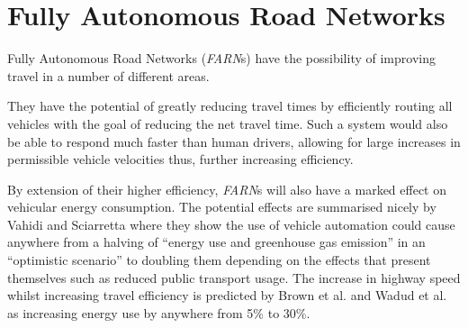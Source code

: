 \section{Fully Autonomous Road Networks}

Fully Autonomous Road Networks (\textit{FARN}s) have the possibility of improving travel in a number of different areas.

They have the potential of greatly reducing travel times by efficiently routing all vehicles with the goal of reducing the net travel time. Such a system would also be able to respond much faster than human drivers, allowing for large increases in permissible vehicle velocities thus, further increasing efficiency.

By extension of their higher efficiency, \textit{FARN}s will also have a marked effect on vehicular energy consumption. The potential effects are summarised nicely by Vahidi and Sciarretta\cite{vahidiEnergySavingPotentials2018} where they show the use of vehicle automation could cause anywhere from a halving of ``energy use and greenhouse gas emission'' in an ``optimistic scenario'' to doubling them depending on the effects that present themselves such as reduced public transport usage. The increase in highway speed whilst increasing travel efficiency is predicted by Brown et al.\cite{brownAnalysisPossibleEnergy2014} and Wadud et al.\cite{wadudHelpHindranceTravel2016} as increasing energy use by anywhere from 5\% to 30\%.



